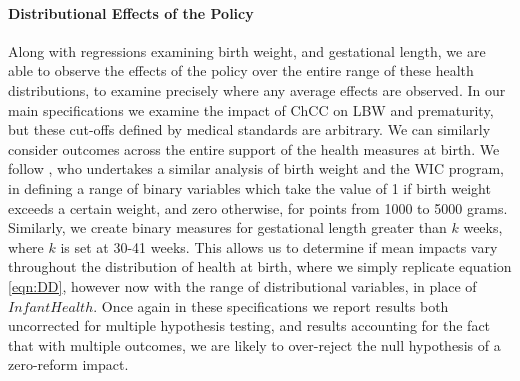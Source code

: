 \documentclass[12pt]{article}
\begin{document}
\begin{spacing}{1.4}

\paragraph{Distributional Effects of the Policy}
Along with regressions examining birth weight, and gestational
length, we are able to observe the effects of the policy over the
entire range of these health distributions, to examine precisely
where any average effects are observed.  In our main specifications
we examine the impact of ChCC on LBW and prematurity, but these
cut-offs defined by medical standards are arbitrary. We can
similarly consider outcomes across the entire support of the health
measures at birth. We follow \citet{RossinSlater2013}, who
undertakes a similar analysis of birth weight and the WIC program,
in defining a range of binary variables which take the value of
1 if birth weight exceeds a certain weight, and zero otherwise,
for points from 1000 to 5000 grams.  Similarly, we create binary
measures for gestational length greater than $k$ weeks, where
$k$ is set at 30-41 weeks.  This allows us to determine if mean
impacts vary throughout the distribution of health at birth,
where we simply replicate equation \ref{eqn:DD}, however now with
the range of distributional variables, in place of $InfantHealth$.
Once again in these specifications we report results both uncorrected
for multiple hypothesis testing, and results accounting for the fact
that with multiple outcomes, we are likely to over-reject the null
hypothesis of a zero-reform impact.


\end{spacing}
\end{document}
